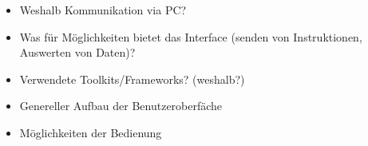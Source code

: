 \begin{itemize}
    \item
        Weshalb Kommunikation via PC?
    \item
        Was f\"ur M\"oglichkeiten bietet das Interface (senden von Instruktionen, Auswerten von Daten)?
    \item
        Verwendete Toolkits/Frameworks? (weshalb?)
    \item
        Genereller Aufbau der Benutzeroberf\"ache
    \item
        M\"oglichkeiten der Bedienung
\end{itemize}
